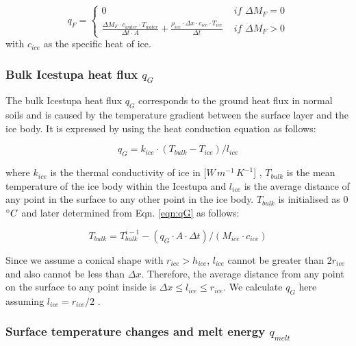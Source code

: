 \documentclass[utf8]{frontiersSCNS} %
\begin{document}
\begin{equation} q_{F} = \left\{ \begin{array}{ll}
        
         0 & \textit{ if } \Delta M_{F} = 0\\ \frac{ \Delta M_F \cdot c_{water} \cdot T_{water}}{\Delta t \cdot A} +
         \frac{\rho_{ice} \cdot \Delta x \cdot c_{ice} \cdot T_{ice}}{\Delta t} & \textit{ if } \Delta M_{F} > 0 
         
    \end{array} \right.  \label{eqn:qF} \end{equation} with $c_{ice}$ as the specific heat of ice. 

\subsubsection{Bulk Icestupa heat flux $q_{G}$} \label{sec:Bulkflux} The bulk Icestupa heat flux $q_{G}$ corresponds to
the ground heat flux in normal soils and is caused by the temperature gradient between the surface layer and the ice
body. It is expressed by using the heat conduction equation as follows:

\begin{equation} q_{G} = k_{ice} \cdot (T_{bulk}-T_{ice})/l_{ice} \label{eqn:qG}    \end{equation}

where $k_{ice}$ is the thermal conductivity of ice in [$W\, m^{-1}\,K^{-1}$] , $T_{bulk}$ is the mean temperature of the
ice body within the Icestupa and $l_{ice}$ is the average distance of any point in the surface to any other point in the
ice body. $T_{bulk}$ is initialised as 0 $\degree C$ and later determined from Eqn. \ref{eqn:qG} as follows:

\begin{equation} T_{bulk} = T_{bulk}^{i-1} - (q_{G} \cdot A \cdot \Delta t)/(M_{ice} \cdot c_{ice}) \end{equation}

Since we assume a conical shape with $r_{ice} > h_{ice}$, $l_{ice}$ cannot be greater than $2r_{ice}$ and also cannot be
less than $\Delta x$. Therefore, the average distance from any point on the surface to any point inside is $\Delta x
\leq l_{ice} \leq r_{ice}$. We calculate $q_{G}$ here assuming $l_{ice} = r_{ice}/2$ .

\subsubsection{Surface temperature changes and melt energy $q_{melt}$}
\end{document}
